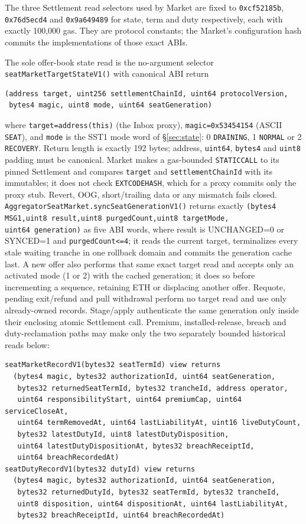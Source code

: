 \documentclass[a4paper,11pt]{article}
\newcommand{\code}[1]{\nolinkurl{#1}}
\begin{document}
The three Settlement read selectors used by Market are fixed to
\code{0xcf52185b}, \code{0x76d5ecd4} and \code{0x9a649489} for state, term
and duty respectively, each with exactly 100,000 gas.  They are protocol
constants; the Market's configuration hash commits the implementations of
those exact ABIs.

The sole offer-book state read is the no-argument selector
\code{seatMarketTargetStateV1()} with canonical ABI return
\begin{verbatim}
(address target, uint256 settlementChainId, uint64 protocolVersion,
 bytes4 magic, uint8 mode, uint64 seatGeneration)
\end{verbatim}
where \code{target=address(this)} (the Inbox proxy),
\code{magic=0x53454154} (ASCII \code{SEAT}), and \code{mode} is the SST1 mode
word of \S\ref{sec:state}: 0 \code{DRAINING}, 1 \code{NORMAL} or 2
\code{RECOVERY}.  Return length is exactly 192 bytes; address, \code{uint64},
\code{bytes4} and \code{uint8} padding must be canonical.  Market makes a
gas-bounded \code{STATICCALL} to its pinned Settlement and compares
\code{target} and \code{settlementChainId} with its immutables; it does not
check \code{EXTCODEHASH}, which for a proxy commits only the proxy stub.
Revert, OOG, short/trailing data or any mismatch fails closed.
\code{AggregatorSeatMarket.syncSeatGenerationV1()} returns exactly
\code{(bytes4 MSG1,uint8 result,uint8 purgedCount,uint8 targetMode,
uint64 generation)} as five ABI words,
where result is UNCHANGED=0 or SYNCED=1 and \code{purgedCount<=4}; it reads the
current target, terminalizes every stale waiting tranche in one rollback domain
and commits the generation cache last.  A new offer also performs that same
exact target read and accepts only an activated mode (1 or 2) with the cached
generation; it does so
before incrementing a sequence, retaining ETH or displacing another offer.
Requote, pending exit/refund and pull withdrawal perform no target read and use
only already-owned records.  Stage/apply authenticate the same
generation only inside their enclosing atomic Settlement call.  Premium,
installed-release, breach and duty-reclamation paths may make only the two
separately bounded historical reads below:
\begin{verbatim}
seatMarketRecordV1(bytes32 seatTermId) view returns
  (bytes4 magic, bytes32 authorizationId, uint64 seatGeneration,
   bytes32 returnedSeatTermId, bytes32 trancheId, address operator,
   uint64 responsibilityStart, uint64 premiumCap, uint64 serviceCloseAt,
   uint64 termRemovedAt, uint64 lastLiabilityAt, uint16 liveDutyCount,
   bytes32 latestDutyId, uint8 latestDutyDisposition,
   uint64 latestDutyDispositionAt, bytes32 breachReceiptId,
   uint64 breachRecordedAt)
seatDutyRecordV1(bytes32 dutyId) view returns
  (bytes4 magic, bytes32 authorizationId, uint64 seatGeneration,
   bytes32 returnedDutyId, bytes32 seatTermId, bytes32 trancheId,
   uint8 disposition, uint64 dispositionAt, uint64 lastLiabilityAt,
   bytes32 breachReceiptId, uint64 breachRecordedAt)
\end{verbatim}
\end{document}

